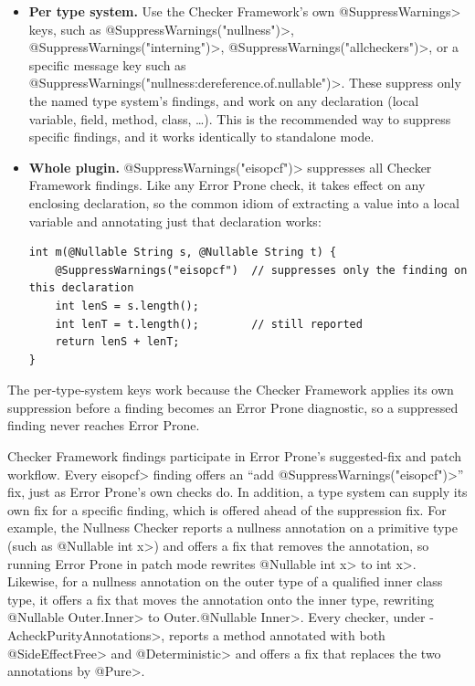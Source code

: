 \begin{itemize}
\item
  \textbf{Per type system.}  Use the Checker Framework's own \<@SuppressWarnings> keys,
  such as \<@SuppressWarnings("nullness")>, \<@SuppressWarnings("interning")>,
  \<@SuppressWarnings("allcheckers")>, or a specific message key such as
  \<@SuppressWarnings("nullness:dereference.of.nullable")>.  These suppress only the named
  type system's findings, and work on any declaration (local variable, field, method,
  class, \ldots{}).  This is the recommended way to suppress specific findings, and it
  works identically to standalone mode.
\item
  \textbf{Whole plugin.}  \<@SuppressWarnings("eisopcf")> suppresses all Checker Framework
  findings.  Like any Error Prone check, it takes effect on any enclosing declaration, so
  the common idiom of extracting a value into a local variable and annotating just that
  declaration works:
\begin{Verbatim}
int m(@Nullable String s, @Nullable String t) {
    @SuppressWarnings("eisopcf")  // suppresses only the finding on this declaration
    int lenS = s.length();
    int lenT = t.length();        // still reported
    return lenS + lenT;
}
\end{Verbatim}
\end{itemize}

The per-type-system keys work because the Checker Framework applies its own suppression
before a finding becomes an Error Prone diagnostic, so a suppressed finding never reaches
Error Prone.


Checker Framework findings participate in Error Prone's suggested-fix and patch workflow.
Every \<eisopcf> finding offers an ``add \<@SuppressWarnings("eisopcf")>'' fix, just as
Error Prone's own checks do.  In addition, a type system can supply its own fix for a
specific finding, which is offered ahead of the suppression fix.  For example, the Nullness
Checker reports a nullness annotation on a primitive type (such as \<@Nullable int x>) and
offers a fix that removes the annotation, so running Error Prone in patch mode rewrites
\<@Nullable int x> to \<int x>.  Likewise, for a nullness annotation on the outer type of a
qualified inner class type, it offers a fix that moves the annotation onto the inner type,
rewriting \<@Nullable Outer.Inner> to \<Outer.@Nullable Inner>.  Every checker, under
\<-AcheckPurityAnnotations>, reports a method annotated with both \<@SideEffectFree> and
\<@Deterministic> and offers a fix that replaces the two annotations by \<@Pure>.

